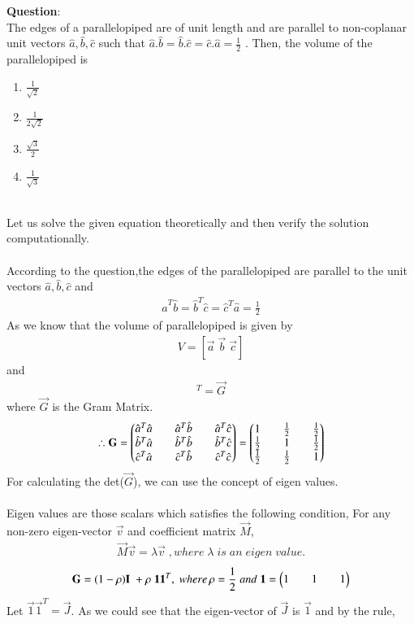\documentclass[journal]{IEEEtran}
\begin{document}
\textbf{Question}:\\
The edges of a parallelopiped are of unit length and are parallel to non-coplanar unit vectors $\hat{a},\hat{b},\hat{c}$ such that $\hat{a}.\hat{b}=\hat{b}.\hat{c}=\hat{c}.\hat{a}=\frac{1}{2}$ . Then, the volume of the parallelopiped is
\begin{multicols}{4}
\begin{enumerate}
    \item $\frac{1}{\sqrt{2}}$
    \item $\frac{1}{2\sqrt{2}}$
    \item $\frac{\sqrt{3}}{2}$
    \item $\frac{1}{\sqrt{3}}$
\end{enumerate}
\end{multicols}
\solution \\
Let us solve the given equation theoretically and then verify the solution computationally.\\
\\
According to the question,the edges of the parallelopiped are parallel to the unit vectors $\hat{a},\hat{b},\hat{c}$ and\\
\begin{align*}
    \hat{a}^T\hat{b}=\hat{b}^T\hat{c}=\hat{c}^T\hat{a}=\frac{1}{2}
\end{align*}
As we know that the volume of parallelopiped is given by
\begin{align*}
    V=[\vec{a}\;\vec{b}\;\vec{c}]
\end{align*}
and
\begin{align*}
    [\vec{a}\;\vec{b}\;\vec{c}][\vec{a}\;\vec{b}\;\vec{c}]^T=\vec{G}
\end{align*}
where $\vec{G}$ is the Gram Matrix.
\begin{align*}
    \therefore \mathbf{G}=\begin{pmatrix}\hat{a}^T\hat{a}&&\hat{a}^T\hat{b}&&\hat{a}^T\hat{c} \\ \hat{b}^T\hat{a}&& \hat{b}^T\hat{b}&& \hat{b}^T\hat{c} \\ \hat{c}^T\hat{a}&& \hat{c}^T\hat{b}&& \hat{c}^T\hat{c}\end{pmatrix}=\begin{pmatrix}1&&\frac{1}{2}&&\frac{1}{2}\\ \frac{1}{2}&&1&&\frac{1}{2}\\ \frac{1}{2}&&\frac{1}{2}&&1\end{pmatrix}
\end{align*}
For calculating the det($\vec{G}$), we can use the concept of eigen values.\\
\\
Eigen values are those scalars which satisfies the following condition,
For any non-zero eigen-vector $\vec{v}$ and coefficient matrix $\vec{M}$,
\begin{align*}
    \vec{M}\vec{v}=\lambda \vec{v} \; , where \; \lambda \;is\; an \;eigen\; value.
\end{align*}
\begin{align*}
     \mathbf{G}=(1-\rho)\mathbf{I}\;+\rho\;\mathbf{1}\mathbf{1}^T, \; where\, \rho=\frac{1}{2}\;and\;\mathbf{1}=\begin{pmatrix}1&&1&&1\end{pmatrix}
\end{align*}
Let $\vec{1}\vec{1}^T=\vec{J}$. As we could see that the eigen-vector of $\vec{J}$ is $\vec{1}$ and by the rule,
\newpage
\vspace*{0.25cm}
\end{document}
